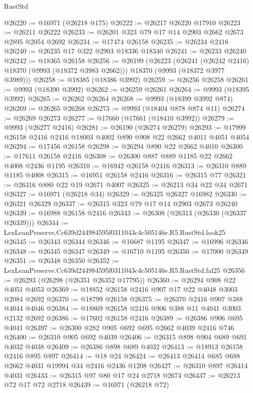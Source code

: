 \begin{lexlean}{RustStd}
\begin{coremodule}
@26220 := @16971 (@26218 @175)
@26222 := @26217 @26220 @17910
@26223 := @26211 @26222
@26233 := @26201 @323 @79 @17 @14 @2903 @2662 @2673 @2895 @2054 @2692
@26234 := @17474 @26158
@26235 := @26234 @2416
@26240 := @26235 @17 @322 @2903 @18336 @18340
@26241 := @26233 @26240
@26242 := @18365 @26158
@26256 := @26199
    (@26223
      (@26241 (@26242 @2416) @18370 (@9993 (@18372 @3983 @2662)))
      @18370
      (@9993 (@18372 @3977 @3989)))
@26258 := @18385 (@18386 @3992)
@26259 := @26256 @26258
@26261 := @9993 (@18390 @3992)
@26262 := @26259 @26261
@26264 := @9993 (@18395 @3992)
@26265 := @26262 @26264
@26268 := @9993 (@18399 @3992 @874)
@26269 := @26265 @26268
@26273 := @9993 (@18404 @878 @874 @11)
@26274 := @26269 @26273
@26277 := @17660 (@17661 (@18410 @3992))
@26279 := @9993 (@26277 @2416)
@26281 := @26190 (@26274 @26279)
@26293 := @17999 @26158 @2416 @2416 @18003 @4002 @890 @908 @22 @2662 @4011 @4051 @4054
@26294 := @17456 @26158
@26298 := @26294 @890 @22 @2662 @4010
@26300 := @17611 @26158 @2416
@26308 := @26300 @887 @889 @1185 @22 @2662 @4008 @2436 @1195
@26310 := @16942 @26158 @2416
@26313 := @26310 @889 @1185 @4008
@26315 := @16951 @26158 @2416
@26316 := @26315 @77
@26321 := @26316 @880 @22 @19 @2671 @4007
@26325 := @26213 @34 @22 @34 @2671
@26327 := @16971 (@26218 @34)
@26329 := @26325 @26327 @16982
@26330 := @26321 @26329
@26337 := @26315 @323 @79 @17 @14 @2903 @2673 @26240
@26339 := @16988 @26158 @2416
@26343 := @26308 (@26313 (@26330 (@26337 @26339)))
@26344 := LexLeanPreserve.Cc639d244984595f0311043c4c505146e.R5.RustStd.look25
@26345 := @26343 @26344
@26346 := @16687 @1195
@26347 := @16996 @26346
@26348 := @26345 @26347
@26349 := @16710 @1195
@26350 := @17000 @26349
@26351 := @26348 @26350
@26352 := LexLeanPreserve.Cc639d244984595f0311043c4c505146e.R5.RustStd.fal25
@26356 := @26293 (@26298 (@26351 @26352 @17795))
@26360 := @26294 @908 @22 @4051 @4053
@26369 := @18852 @26158 @2416 @907 @17 @22 @4048 @3003 @2084 @2692
@26370 := @18799 @26158
@26375 := @26370 @2416 @907 @388 @4044 @4046
@26384 := @18869 @26158 @2416 @906 @388 @11 @4041 @3003 @2132 @2692
@26386 := @17602 @26158 @2416
@26389 := @26386 @906 @695 @4041
@26397 := @26300 @282 @905 @692 @695 @2662 @4039 @2416 @746
@26400 := @26310 @905 @692 @4039
@26406 := @26315 @898 @904 @689 @691 @4032 @4038
@26409 := @26386 @898 @689 @4032
@26413 := @18913 @26158 @2416 @895 @897
@26414 := @18 @24
@26424 := @26413 @26414 @685 @688 @2662 @4031 @19994 @34 @2416 @2436 @1208
@26427 := @26310 @897 @26414 @4031
@26433 := @26315 @97 @80 @17 @24 @2718 @2674
@26437 := @26213 @72 @17 @72 @2718
@26439 := @16971 (@26218 @72)

\end{coremodule}
\end{lexlean}
